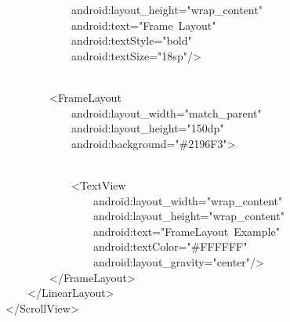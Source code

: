 {\ttfamily\small \ \ \ \ \ \ \ \ \ \ \ \ android:layout\_height="wrap\_content"} \\
{\ttfamily\small \ \ \ \ \ \ \ \ \ \ \ \ android:text="Frame\ Layout"} \\
{\ttfamily\small \ \ \ \ \ \ \ \ \ \ \ \ android:textStyle="bold"} \\
{\ttfamily\small \ \ \ \ \ \ \ \ \ \ \ \ android:textSize="18sp"/\textgreater{}} \\
\strut \\
{\ttfamily\small \ \ \ \ \ \ \ \ \textless{}FrameLayout} \\
{\ttfamily\small \ \ \ \ \ \ \ \ \ \ \ \ android:layout\_width="match\_parent"} \\
{\ttfamily\small \ \ \ \ \ \ \ \ \ \ \ \ android:layout\_height="150dp"} \\
{\ttfamily\small \ \ \ \ \ \ \ \ \ \ \ \ android:background="\#2196F3"\textgreater{}} \\
\strut \\
{\ttfamily\small \ \ \ \ \ \ \ \ \ \ \ \ \textless{}TextView} \\
{\ttfamily\small \ \ \ \ \ \ \ \ \ \ \ \ \ \ \ \ android:layout\_width="wrap\_content"} \\
{\ttfamily\small \ \ \ \ \ \ \ \ \ \ \ \ \ \ \ \ android:layout\_height="wrap\_content"} \\
{\ttfamily\small \ \ \ \ \ \ \ \ \ \ \ \ \ \ \ \ android:text="FrameLayout\ Example"} \\
{\ttfamily\small \ \ \ \ \ \ \ \ \ \ \ \ \ \ \ \ android:textColor="\#FFFFFF"} \\
{\ttfamily\small \ \ \ \ \ \ \ \ \ \ \ \ \ \ \ \ android:layout\_gravity="center"/\textgreater{}} \\
{\ttfamily\small \ \ \ \ \ \ \ \ \textless{}/FrameLayout\textgreater{}} \\
{\ttfamily\small \ \ \ \ \textless{}/LinearLayout\textgreater{}} \\
{\ttfamily\small \textless{}/ScrollView\textgreater{}} \\
